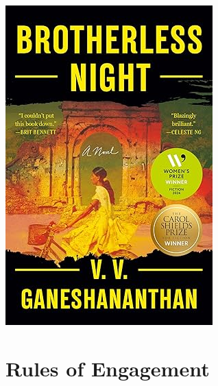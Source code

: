 \documentclass[aspectratio=169]{beamer}
\begin{document}
\begin{frame}
{\begin{minipage}{.45\textwidth}
\begin{center}
            \end{center}
        \end{minipage}
        \begin{minipage}{.45\textwidth}
            \begin{center}
                \includegraphics[width = .7\textwidth]{brotherlessnight.jpg}
            \end{center}
        \end{minipage}
    }
\end{frame}

\section{Rules of Engagement}
\end{document}
